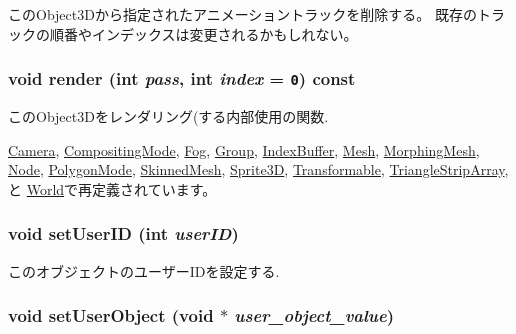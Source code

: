 このObject3Dから指定されたアニメーショントラックを削除する。 既存のトラックの順番やインデックスは変更されるかもしれない。 \hypertarget{classm3g_1_1Object3D_1efcb1973989d9963d5bd6d03065d389}{
\subsubsection[{render}]{\setlength{\rightskip}{0pt plus 5cm}void render (int {\em pass}, \/  int {\em index} = {\tt 0}) const}}
\label{classm3g_1_1Object3D_1efcb1973989d9963d5bd6d03065d389}


このObject3Dをレンダリング(する内部使用の関数. 

\hyperlink{classm3g_1_1Camera_1efcb1973989d9963d5bd6d03065d389}{Camera}, \hyperlink{classm3g_1_1CompositingMode_1efcb1973989d9963d5bd6d03065d389}{CompositingMode}, \hyperlink{classm3g_1_1Fog_1efcb1973989d9963d5bd6d03065d389}{Fog}, \hyperlink{classm3g_1_1Group_1efcb1973989d9963d5bd6d03065d389}{Group}, \hyperlink{classm3g_1_1IndexBuffer_1efcb1973989d9963d5bd6d03065d389}{IndexBuffer}, \hyperlink{classm3g_1_1Mesh_1efcb1973989d9963d5bd6d03065d389}{Mesh}, \hyperlink{classm3g_1_1MorphingMesh_1efcb1973989d9963d5bd6d03065d389}{MorphingMesh}, \hyperlink{classm3g_1_1Node_1efcb1973989d9963d5bd6d03065d389}{Node}, \hyperlink{classm3g_1_1PolygonMode_1efcb1973989d9963d5bd6d03065d389}{PolygonMode}, \hyperlink{classm3g_1_1SkinnedMesh_1efcb1973989d9963d5bd6d03065d389}{SkinnedMesh}, \hyperlink{classm3g_1_1Sprite3D_1efcb1973989d9963d5bd6d03065d389}{Sprite3D}, \hyperlink{classm3g_1_1Transformable_1efcb1973989d9963d5bd6d03065d389}{Transformable}, \hyperlink{classm3g_1_1TriangleStripArray_1efcb1973989d9963d5bd6d03065d389}{TriangleStripArray}, と \hyperlink{classm3g_1_1World_1efcb1973989d9963d5bd6d03065d389}{World}で再定義されています。\hypertarget{classm3g_1_1Object3D_5e4753e91dca5aa56abacb7fde69f332}{
\subsubsection[{setUserID}]{\setlength{\rightskip}{0pt plus 5cm}void setUserID (int {\em userID})}}
\label{classm3g_1_1Object3D_5e4753e91dca5aa56abacb7fde69f332}


このオブジェクトのユーザーIDを設定する. \hypertarget{classm3g_1_1Object3D_052563fbd888204955f1a56628882f14}{
\subsubsection[{setUserObject}]{\setlength{\rightskip}{0pt plus 5cm}void setUserObject (void $\ast$ {\em user\_\-object\_\-value})}}
\label{classm3g_1_1Object3D_052563fbd888204955f1a56628882f14}


